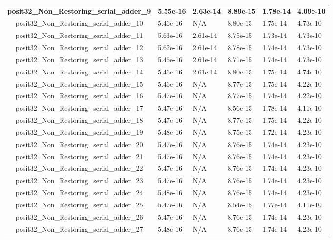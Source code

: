 \begin{tabularx}{\linewidth}{|c|X|X|X|X|X|}
posit32\_Non\_Restoring\_serial\_adder\_9 & 5.55e-16 & 2.63e-14 & 8.89e-15 & 1.78e-14 & 4.09e-10\\ \hline
posit32\_Non\_Restoring\_serial\_adder\_10 & 5.46e-16 & N/A & 8.80e-15 & 1.75e-14 & 4.73e-10\\ \hline
posit32\_Non\_Restoring\_serial\_adder\_11 & 5.63e-16 & 2.61e-14 & 8.75e-15 & 1.73e-14 & 4.73e-10\\ \hline
posit32\_Non\_Restoring\_serial\_adder\_12 & 5.62e-16 & 2.61e-14 & 8.78e-15 & 1.74e-14 & 4.73e-10\\ \hline
posit32\_Non\_Restoring\_serial\_adder\_13 & 5.46e-16 & 2.61e-14 & 8.71e-15 & 1.74e-14 & 4.73e-10\\ \hline
posit32\_Non\_Restoring\_serial\_adder\_14 & 5.46e-16 & 2.61e-14 & 8.80e-15 & 1.75e-14 & 4.74e-10\\ \hline
posit32\_Non\_Restoring\_serial\_adder\_15 & 5.46e-16 & N/A & 8.77e-15 & 1.75e-14 & 4.22e-10\\ \hline
posit32\_Non\_Restoring\_serial\_adder\_16 & 5.47e-16 & N/A & 8.77e-15 & 1.74e-14 & 4.22e-10\\ \hline
posit32\_Non\_Restoring\_serial\_adder\_17 & 5.47e-16 & N/A & 8.56e-15 & 1.78e-14 & 4.11e-10\\ \hline
posit32\_Non\_Restoring\_serial\_adder\_18 & 5.47e-16 & N/A & 8.77e-15 & 1.75e-14 & 4.22e-10\\ \hline
posit32\_Non\_Restoring\_serial\_adder\_19 & 5.48e-16 & N/A & 8.75e-15 & 1.72e-14 & 4.23e-10\\ \hline
posit32\_Non\_Restoring\_serial\_adder\_20 & 5.47e-16 & N/A & 8.76e-15 & 1.74e-14 & 4.23e-10\\ \hline
posit32\_Non\_Restoring\_serial\_adder\_21 & 5.47e-16 & N/A & 8.76e-15 & 1.74e-14 & 4.23e-10\\ \hline
posit32\_Non\_Restoring\_serial\_adder\_22 & 5.47e-16 & N/A & 8.76e-15 & 1.74e-14 & 4.23e-10\\ \hline
posit32\_Non\_Restoring\_serial\_adder\_23 & 5.47e-16 & N/A & 8.76e-15 & 1.74e-14 & 4.23e-10\\ \hline
posit32\_Non\_Restoring\_serial\_adder\_24 & 5.48e-16 & N/A & 8.76e-15 & 1.74e-14 & 4.23e-10\\ \hline
posit32\_Non\_Restoring\_serial\_adder\_25 & 5.47e-16 & N/A & 8.54e-15 & 1.77e-14 & 4.11e-10\\ \hline
posit32\_Non\_Restoring\_serial\_adder\_26 & 5.47e-16 & N/A & 8.76e-15 & 1.74e-14 & 4.23e-10\\ \hline
posit32\_Non\_Restoring\_serial\_adder\_27 & 5.48e-16 & N/A & 8.76e-15 & 1.74e-14 & 4.23e-10\\ \hline

\end{tabularx}
